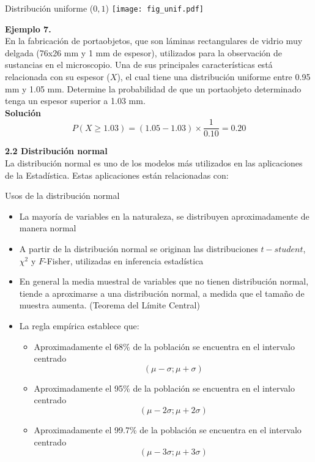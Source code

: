 \documentclass[base=hide,12pt]{elegantbook}
\begin{document}
\begin{center}
	Distribución uniforme ($0,1$)
	\texttt{[image: fig\_unif.pdf]}
\end{center}


\vspace{.5cm} 
\textcolor{col3}{\bf \large Ejemplo 7.} \\
En la fabricación de portaobjetos, que son láminas rectangulares de vidrio muy delgada (76x26 mm y 1 mm de espesor), utilizados para  la observación de sustancias en el microscopio. Una de sus principales características está relacionada con su espesor ($X$), el cual tiene una distribución uniforme entre 0.95 mm y 1.05 mm. Determine la probabilidad de que un portaobjeto determinado tenga un espesor superior a 1.03 mm.          \\


\textcolor{col3}{\bf \large Solución }\\
$$P(X\geq 1.03)= (1.05-1.03) \times \frac{1}{0.10}=0.20 $$

\vspace{1cm}
\textcolor{col4}{\LARGE  \bf 2.2 Distribución normal }\\

La distribución normal es uno de los modelos más utilizados en las aplicaciones de la Estadística. Estas aplicaciones están relacionadas con:

\begin{Box4}{Usos de la distribución normal}
	\begin{itemize}
		\item La mayoría de variables en la naturaleza, se distribuyen aproximadamente de manera normal
		\item A partir de la distribución normal se originan las distribuciones $t-student$, $\chi^{2}$ y $F$-Fisher, utilizadas en inferencia estadística
		\item En general la media muestral de variables que no tienen distribución normal, tiende a aproximarse a una distribución normal, a medida que el tamaño de muestra aumenta. (Teorema del Límite Central) 
		\item La regla empírica establece que:
		\begin{itemize}[*]
			\item Aproximadamente el 68\% de la población se encuentra en el intervalo centrado $$(\mu - \sigma ; \mu + \sigma)$$
			\item Aproximadamente el 95\% de la población se encuentra en el intervalo centrado $$(\mu - 2\sigma ; \mu + 2\sigma)$$
			\item Aproximadamente el 99.7\% de la población se encuentra en el intervalo centrado $$(\mu - 3\sigma ; \mu + 3\sigma)$$
		\end{itemize}
	\end{itemize}
\end{Box4}
\end{document}
